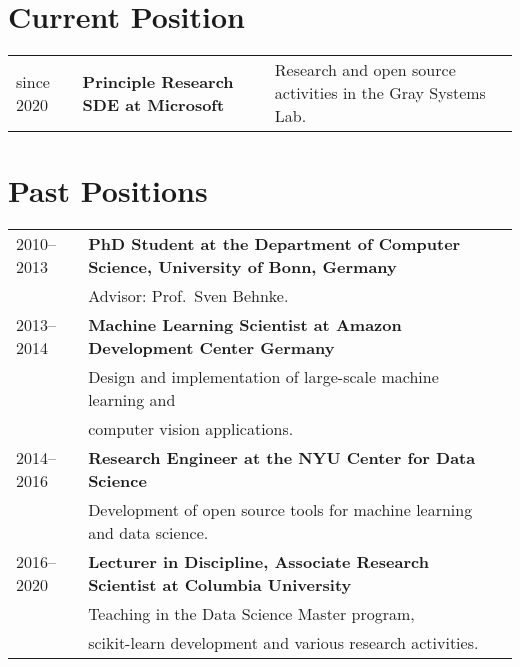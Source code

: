 \documentclass[a4paper,11pt]{article}
\begin{document}
\maketitle

\section{Current Position}
\begin{tabular}{lll}
    since 2020 & \textbf{Principle Research SDE at Microsoft}
               & Research and open source activities in the Gray Systems Lab.
\end{tabular}

\section{Past Positions}
\begin{tabular}{lll}
    2010--2013 & \textbf{PhD Student at the Department of Computer Science, University of Bonn, Germany}\\
         & Advisor: Prof.\ Sven Behnke. \\
    2013--2014 & \textbf{Machine Learning Scientist at Amazon Development Center Germany}\\
              & Design and implementation of large-scale machine learning and\\
              & computer vision applications.\\
    2014--2016 & \textbf{Research Engineer at the NYU Center for Data Science}\\
               & Development of open source tools for machine learning and data science.\\
    2016--2020 & \textbf{Lecturer in Discipline, Associate Research Scientist at Columbia University}\\
               & Teaching in the Data Science Master program, \\
               & scikit-learn development and various research activities.
\end{tabular}
\end{document}
